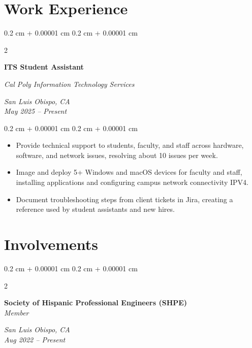 \documentclass[10pt, letterpaper]{article}
\newenvironment{highlights}{
    \begin{itemize}[
        topsep=0.10 cm,
        parsep=0.10 cm,
        partopsep=0pt,
        itemsep=0pt,
        leftmargin=0.4 cm + 10pt
    ]
}{
    \end{itemize}
} %
\newenvironment{onecolentry}{
    \begin{adjustwidth}{
        0.2 cm + 0.00001 cm
    }{
        0.2 cm + 0.00001 cm
    }
}{
    \end{adjustwidth}
} %
\newenvironment{twocolentry}[2][]{
    \onecolentry
    \def\secondColumn{#2}
    \setcolumnwidth{\fill, 4.5 cm}
    \begin{paracol}{2}
}{
    \switchcolumn \raggedleft \secondColumn
    \end{paracol}
    \endonecolentry
} %
\begin{document}

\section{Work Experience}
\vspace{0.14 cm}
\begin{twocolentry}{
\textit{San Luis Obispo, CA} \\   
\textit{May 2025 – Present}}
\textbf{ITS Student Assistant}

\textit{Cal Poly Information Technology Services}
\end{twocolentry}

\vspace{0.10 cm}
\begin{onecolentry}
\begin{highlights}
    \item Provide technical support to students, faculty, and staff across hardware, software, and network issues, resolving about 10 issues per week.
    \item Image and deploy 5+ Windows and macOS devices for faculty and staff, installing applications and configuring campus network connectivity IPV4.
    \item Document troubleshooting steps from client tickets in Jira, creating a reference used by student assistants and new hires.
\end{highlights}
\end{onecolentry}

\vspace{0.2 cm}

\section{Involvements}
\vspace{0.14 cm}
\begin{twocolentry}{
\textit{San Luis Obispo, CA} \\
\textit{Aug 2022 -- Present}}
\textbf{Society of Hispanic Professional Engineers (SHPE)} \\
\textit{Member}
\end{twocolentry}
\vspace{0.2 cm}
\end{document}
